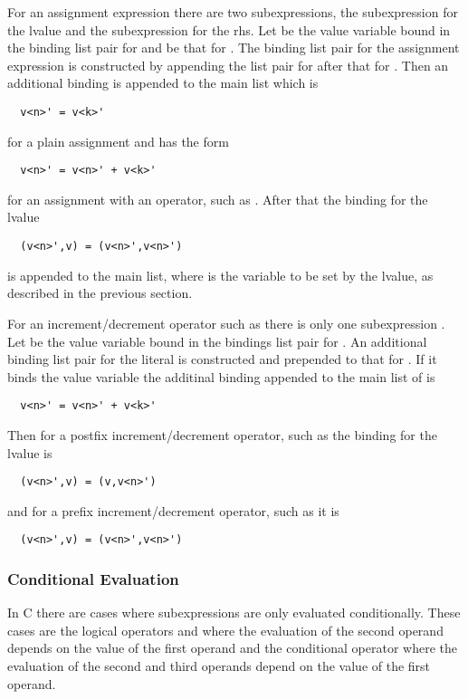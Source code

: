 For an assignment expression there are two subexpressions, the subexpression  for the lvalue and the subexpression 
for the rhs. Let  be the value variable bound in the binding list pair for  and  be that for .
The binding list pair for the assignment expression is constructed by appending the list pair for  after that for .
Then an additional binding is appended to the main list which is
\begin{verbatim}
  v<n>' = v<k>'
\end{verbatim}
for a plain assignment  and has the form
\begin{verbatim}
  v<n>' = v<n>' + v<k>'
\end{verbatim}
for an assignment with an operator, such as . After that the binding for the lvalue 
\begin{verbatim}
  (v<n>',v) = (v<n>',v<n>')
\end{verbatim}
is appended to the main list, where  is the variable to be set by the lvalue, as described in the previous section.

For an increment/decrement operator such as  there is only one subexpression . Let  be the value variable bound in 
the bindings list pair for . An additional binding list pair for the literal  is constructed and prepended to that for .
If it binds the value variable  the additinal binding appended to the main list of  is
\begin{verbatim}
  v<n>' = v<n>' + v<k>'
\end{verbatim}
Then for a postfix increment/decrement operator, such as  the binding for the lvalue is
\begin{verbatim}
  (v<n>',v) = (v,v<n>')
\end{verbatim}
and for a prefix increment/decrement operator, such as  it is
\begin{verbatim}
  (v<n>',v) = (v<n>',v<n>')
\end{verbatim}

\subsubsection{Conditional Evaluation}

In C there are cases where subexpressions are only evaluated conditionally. These cases are the logical operators \code{\&\&} and \code{||}
where the evaluation of the second operand depends on the value of the first operand and the conditional operator where the evaluation
of the second and third operands depend on the value of the first operand. 

